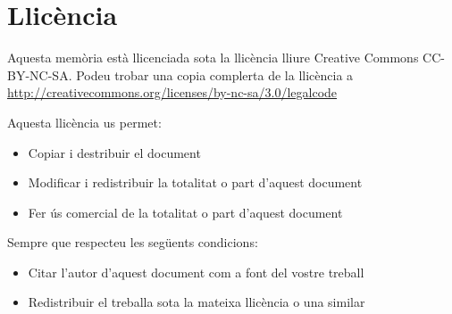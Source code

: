\chapter*{Llicència}

Aquesta memòria està llicenciada sota la llicència lliure Creative Commons CC-BY-NC-SA. Podeu trobar una copia complerta de la llicència a \url{http://creativecommons.org/licenses/by-nc-sa/3.0/legalcode}

Aquesta llicència us permet: 

\begin{itemize}
    \item{Copiar i destribuir el document}
    \item{Modificar i redistribuir la totalitat o part d'aquest document}
    \item{Fer ús comercial de la totalitat o part d'aquest document} 
\end{itemize}

Sempre que respecteu les següents condicions: 

\begin{itemize}
    \item{Citar l'autor d'aquest document com a font del vostre treball}
    \item{Redistribuir el treballa sota la mateixa llicència o una similar}
\end{itemize}


